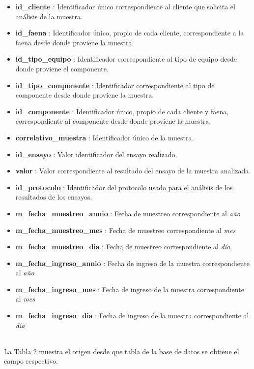 \documentclass{article}
\begin{document}
\begin{itemize}
	\item \textbf{id\_cliente} : Identificador único correspondiente al cliente que solicita el an\'alisis de la muestra.
	\item \textbf{id\_faena} : Identificador único, propio de cada cliente, correspondiente a la faena desde donde proviene la muestra.
	\item \textbf{id\_tipo\_equipo} : Identificador correspondiente al tipo de equipo desde donde proviene el componente.
	\item \textbf{id\_tipo\_componente} : Identificador correspondiente al tipo de componente desde donde proviene la muestra.
	\item \textbf{id\_componente} : Identificador único, propio de cada cliente y faena, correspondiente al componente desde donde proviene la muestra.
	\item \textbf{correlativo\_muestra} : Identificador \'unico de la muestra.
	\item \textbf{id\_ensayo} : Valor identificador del ensayo realizado.
	\item \textbf{valor} : Valor correspondiente al resultado del ensayo de la muestra analizada.
	\item \textbf{id\_protocolo} : Identificador del protocolo usado para el an\'alisis de los resultados de los ensayos.
	\item \textbf{m\_fecha\_muestreo\_annio} : Fecha de muestreo correspondiente al \textit{año}
	\item \textbf{m\_fecha\_muestreo\_mes} : Fecha de muestreo correspondiente al \textit{mes}
	\item \textbf{m\_fecha\_muestreo\_dia} : Fecha de muestreo correspondiente al \textit{día}
	\item \textbf{m\_fecha\_ingreso\_annio} : Fecha de ingreso de la muestra correspondiente al \textit{año}
	\item \textbf{m\_fecha\_ingreso\_mes} : Fecha de ingreso de la muestra correspondiente al \textit{mes}
	\item \textbf{m\_fecha\_ingreso\_dia} : Fecha de ingreso de la muestra correspondiente al \textit{día}
	
\end{itemize}
~\\
La Tabla 2 muestra el origen desde que tabla de la base de datos se obtiene el campo respectivo.
\end{document}
